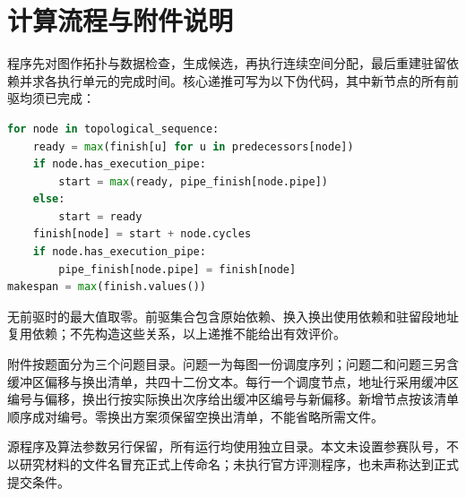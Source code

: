 \section{计算流程与附件说明}
程序先对图作拓扑与数据检查，生成候选，再执行连续空间分配，最后重建驻留依赖并求各执行单元的完成时间。核心递推可写为以下伪代码，其中新节点的所有前驱均须已完成：
\begin{lstlisting}[language=Python]
for node in topological_sequence:
    ready = max(finish[u] for u in predecessors[node])
    if node.has_execution_pipe:
        start = max(ready, pipe_finish[node.pipe])
    else:
        start = ready
    finish[node] = start + node.cycles
    if node.has_execution_pipe:
        pipe_finish[node.pipe] = finish[node]
makespan = max(finish.values())
\end{lstlisting}
无前驱时的最大值取零。前驱集合包含原始依赖、换入换出使用依赖和驻留段地址复用依赖；不先构造这些关系，以上递推不能给出有效评价。

附件按题面分为三个问题目录。问题一为每图一份调度序列；问题二和问题三另含缓冲区偏移与换出清单，共四十二份文本。每行一个调度节点，地址行采用缓冲区编号与偏移，换出行按实际换出次序给出缓冲区编号与新偏移。新增节点按该清单顺序成对编号。零换出方案须保留空换出清单，不能省略所需文件。

源程序及算法参数另行保留，所有运行均使用独立目录。本文未设置参赛队号，不以研究材料的文件名冒充正式上传命名；未执行官方评测程序，也未声称达到正式提交条件。
